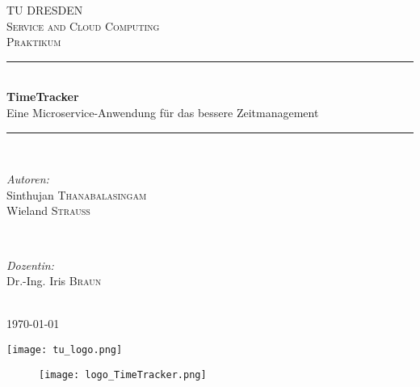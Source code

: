 \documentclass[12pt]{article} %
\begin{document}
\begin{titlepage}

\newcommand{\HRule}{\rule{\linewidth}{0.5mm}} %

\center

\textsc{\LARGE TU DRESDEN}\\[1.5cm] %
\textsc{\Large Service and Cloud Computing}\\[0.5cm] %
\textsc{\large Praktikum}\\[0.5cm] %

\HRule \\[0.4cm]
{ \huge \bfseries TimeTracker}\\[0.4cm] %

{Eine Microservice-Anwendung für das bessere Zeitmanagement}
\HRule \\[1.5cm]

\begin{minipage}{0.4\textwidth}
\begin{flushleft} 
\emph{Autoren:}\\
Sinthujan \textsc{Thanabalasingam}\\
Wieland \textsc{Strauß}
\end{flushleft}
\end{minipage}
~
\begin{minipage}{0.4\textwidth}
\begin{flushright} 
\emph{Dozentin:} \\
 Dr.-Ing. Iris \textsc{Braun} %
\end{flushright}

\end{minipage}\\[3cm]

{\large \today}\\[2cm] %

\begin{center}
	\texttt{[image: tu\_logo.png]}
\end{center}

\vfill %

\end{titlepage}

\tableofcontents %


\begin{figure}[!b]
	\centering
	\texttt{[image: logo\_TimeTracker.png]}
\end{figure}
\end{document}
